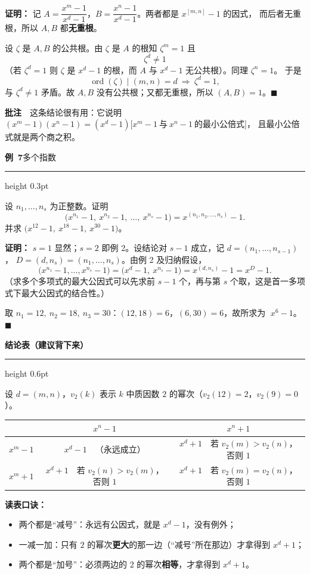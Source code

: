 \documentclass[11pt,a4paper,fontset=windows]{ctexart}
\newcommand{\sect}[1]{\Needspace{12\baselineskip}\par\vspace{16pt}%
  {\large\bfseries\songti #1}\par\vspace{3pt}\hrule height 0.6pt\par\vspace{8pt}}
\newcommand{\uex}[2]{\Needspace{9\baselineskip}\par\vspace{14pt}\noindent
  {\large\bfseries\songti 例~#1}\hfill{\small\color{hdgray}\songti #2}\par\vspace{2pt}%
  \hrule height 0.3pt\par\vspace{6pt}}
\newcommand{\uidea}[1]{\par\noindent{\small\songti\textbf{思路}\ \ #1}\par\vspace{3pt}}
\newcommand{\uann}[1]{\par\vspace{3pt}\noindent
  {\small\color{hdgray}\songti\textbf{批注}\ \ #1}\par\vspace{1pt}}
\newcommand{\uzz}{\textbf{证明：}}
\begin{document}
\uzz
记 $A=\dfrac{x^{m}-1}{x^{d}-1}$，$B=\dfrac{x^{n}-1}{x^{d}-1}$。两者都是 $x^{[m,n]}-1$ 的因式，
而后者无重根，所以 $A,B$ 都\textbf{无重根}。

设 $\zeta$ 是 $A,B$ 的公共根。由 $\zeta$ 是 $A$ 的根知 $\zeta^{m}=1$ 且
\[
\zeta^{d}\neq1
\]
（若 $\zeta^{d}=1$ 则 $\zeta$ 是 $x^{d}-1$ 的根，而 $A$ 与 $x^{d}-1$ 无公共根）。同理 $\zeta^{n}=1$。
于是
\[
\operatorname{ord}(\zeta)\mid (m,n)=d\ \Longrightarrow\ \zeta^{d}=1,
\]
与 $\zeta^{d}\neq1$ 矛盾。故 $A,B$ 没有公共根；又都无重根，所以 $(A,B)=1$。$\blacksquare$

\uann{这条结论很有用：它说明 $(x^{m}-1)(x^{n}-1)=(x^{d}-1)\bigl[x^{m}-1\ \text{与}\ x^{n}-1\ \text{的最小公倍式}\bigr]$，
且最小公倍式就是两个商之积。}

\uex{7}{多个指数}
设 $n_{1},\dots,n_{s}$ 为正整数。证明
\[
\bigl(x^{n_{1}}-1,\ x^{n_{2}}-1,\ \dots,\ x^{n_{s}}-1\bigr)=x^{(n_{1},n_{2},\dots,n_{s})}-1 .
\]
并求 $\bigl(x^{12}-1,\ x^{18}-1,\ x^{30}-1\bigr)$。

\uidea{对 $s$ 归纳，每次用一次例 2。}

\uzz
$s=1$ 显然；$s=2$ 即例 2。设结论对 $s-1$ 成立，记 $d=(n_{1},\dots,n_{s-1})$，
$D=(d,n_{s})=(n_{1},\dots,n_{s})$。由例 2 及归纳假设，
\[
\bigl(x^{n_{1}}-1,\dots,x^{n_{s}}-1\bigr)=\bigl(x^{d}-1,\ x^{n_{s}}-1\bigr)=x^{(d,n_{s})}-1=x^{D}-1 .
\]
（求多个多项式的最大公因式可以先求前 $s-1$ 个，再与第 $s$ 个取，这是首一多项式下最大公因式的结合性。）

取 $n_{1}=12,\ n_{2}=18,\ n_{3}=30$：$(12,18)=6$，$(6,30)=6$，故所求为 $\;x^{6}-1$。$\blacksquare$

\sect{4\quad 结论表（建议背下来）}

设 $d=(m,n)$，$v_{2}(k)$ 表示 $k$ 中质因数 $2$ 的幂次（$v_{2}(12)=2$，$v_{2}(9)=0$）。

\begin{center}
\renewcommand{\arraystretch}{1.9}
\begin{tabular}{@{}c|c|c@{}}
 & $x^{n}-1$ & $x^{n}+1$\\ \hline
$x^{m}-1$ & $x^{d}-1$\ \ （永远成立） & $x^{d}+1$\ \ 若 $v_{2}(m)>v_{2}(n)$，否则 $1$\\ \hline
$x^{m}+1$ & $x^{d}+1$\ \ 若 $v_{2}(n)>v_{2}(m)$，否则 $1$ & $x^{d}+1$\ \ 若 $v_{2}(m)=v_{2}(n)$，否则 $1$\\
\end{tabular}
\end{center}

\smallskip
\textbf{读表口诀：}
\begin{itemize}[leftmargin=2em,itemsep=2pt,topsep=2pt]
\item 两个都是“减号”：永远有公因式，就是 $x^{d}-1$，没有例外；
\item 一减一加：只有 $2$ 的幂次\textbf{更大}的那一边（“减号”所在那边）才拿得到 $x^{d}+1$；
\item 两个都是“加号”：必须两边的 $2$ 的幂次\textbf{相等}，才拿得到 $x^{d}+1$。
\end{itemize}
\end{document}
